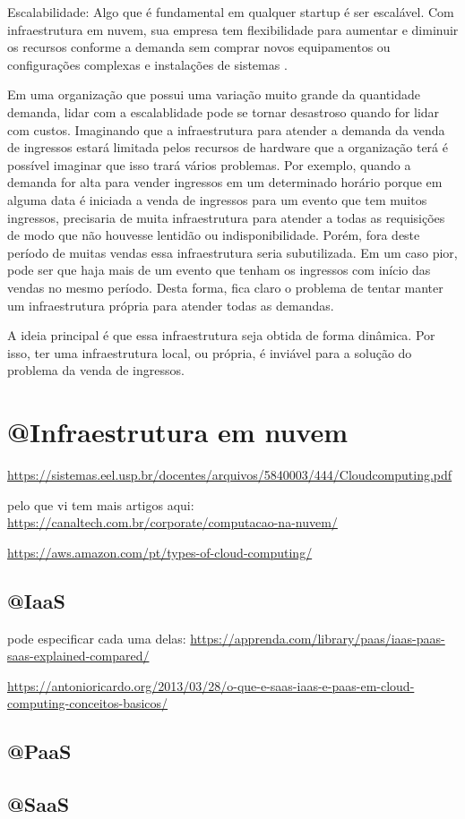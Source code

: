 \begin{citacao}
Escalabilidade: Algo que é fundamental em qualquer startup é ser escalável.
Com infraestrutura em nuvem, sua empresa tem flexibilidade para aumentar e
diminuir os recursos conforme a demanda sem comprar novos equipamentos ou
configurações complexas e instalações de
sistemas \cite{beneficios-da-computacao-em-nuvem-para-sua-startup}.

\end{citacao}

Em uma organização que possui uma variação muito grande da quantidade demanda, lidar
com a escalablidade pode se tornar desastroso quando for lidar com custos. Imaginando
que a infraestrutura para atender a demanda da venda de ingressos estará limitada
pelos recursos de hardware que a organização terá é possível imaginar que isso trará
vários problemas. Por exemplo, quando a demanda for alta para vender ingressos em um
determinado horário porque em alguma data é iniciada a venda de ingressos para um evento
que tem muitos ingressos, precisaria de muita infraestrutura para atender a todas as
requisições de modo que não houvesse lentidão ou indisponibilidade. Porém, fora deste
período de muitas vendas essa infraestrutura seria subutilizada. Em um caso pior, pode
ser que haja mais de um evento que tenham os ingressos com início das vendas no mesmo
período. Desta forma, fica claro o problema de tentar manter um infraestrutura própria
para atender todas as demandas.

A ideia principal é que essa infraestrutura seja obtida de forma dinâmica. Por isso,
ter uma infraestrutura local, ou própria, é inviável para a solução do problema da
venda de ingressos.

\section{@Infraestrutura em nuvem}\label{infraestrutura-em-nuvem}

\url{https://sistemas.eel.usp.br/docentes/arquivos/5840003/444/Cloudcomputing.pdf}


pelo que vi tem mais artigos aqui: \url{https://canaltech.com.br/corporate/computacao-na-nuvem/}

\url{https://aws.amazon.com/pt/types-of-cloud-computing/}

\subsection{@IaaS}

pode especificar cada uma delas:
\url{https://apprenda.com/library/paas/iaas-paas-saas-explained-compared/}

\url{https://antonioricardo.org/2013/03/28/o-que-e-saas-iaas-e-paas-em-cloud-computing-conceitos-basicos/}

\subsection{@PaaS}

\subsection{@SaaS}
